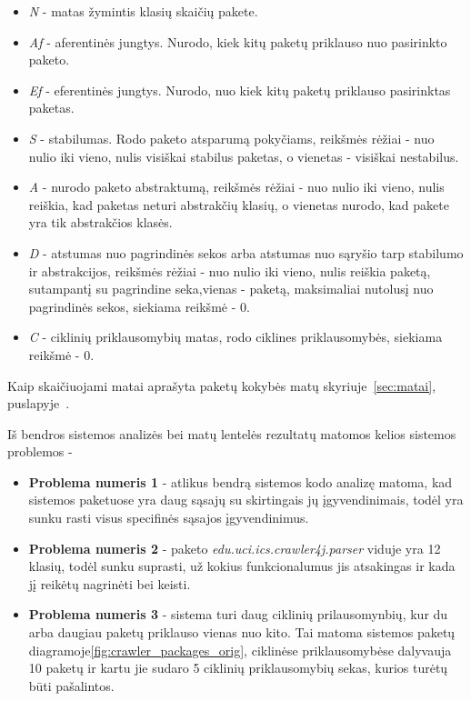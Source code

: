 \begin{itemize}
    \item \textit{N} - matas žymintis klasių skaičių pakete.
    \item \textit{Af} - aferentinės jungtys. Nurodo, kiek kitų paketų priklauso nuo pasirinkto paketo.
    \item \textit{Ef} - eferentinės jungtys. Nurodo, nuo kiek kitų paketų priklauso pasirinktas paketas.
    \item \textit{S} - stabilumas. Rodo paketo atsparumą pokyčiams, reikšmės rėžiai - nuo nulio iki vieno, nulis visiškai stabilus paketas, o vienetas - visiškai nestabilus.
    \item \textit{A} - nurodo paketo abstraktumą, reikšmės rėžiai - nuo nulio iki vieno, nulis reiškia, kad paketas neturi abstrakčių klasių, o vienetas nurodo, kad pakete yra tik abstrakčios klasės.
    \item \textit{D} - atstumas nuo pagrindinės sekos arba atstumas nuo sąryšio tarp stabilumo ir abstrakcijos, reikšmės rėžiai - nuo nulio iki vieno, nulis reiškia paketą, sutampantį su pagrindine seka,vienas - paketą, maksimaliai nutolusį nuo pagrindinės sekos, siekiama reikšmė - 0.
    \item \textit{C} - ciklinių priklausomybių matas, rodo ciklines priklausomybės, siekiama reikšmė - 0.
\end{itemize}
Kaip skaičiuojami matai aprašyta paketų kokybės matų skyriuje~\ref{sec:matai}, puslapyje~\pageref{sec:matai}.

Iš bendros sistemos analizės bei matų lentelės rezultatų matomos kelios sistemos problemos -
\begin{itemize}
    \item \textbf{Problema numeris 1} - atlikus bendrą sistemos kodo analizę matoma,
    kad sistemos paketuose yra daug sąsajų su skirtingais jų įgyvendinimais, todėl yra sunku
    rasti visus specifinės sąsajos įgyvendinimus.
    \item \textbf{Problema numeris 2} - paketo \textit{edu.uci.ics.crawler4j.parser} viduje yra 12 klasių, todėl sunku suprasti, už kokius funkcionalumus jis atsakingas
    ir kada jį reikėtų nagrinėti bei keisti.
    \item \textbf{Problema numeris 3} - sistema turi daug ciklinių prilausomynbių, kur du arba daugiau paketų priklauso vienas nuo kito.
    Tai matoma sistemos paketų diagramoje\ref{fig:crawler_packages_orig}, ciklinėse priklausomybėse dalyvauja 10 paketų ir kartu jie sudaro 5 ciklinių priklausomybių sekas,
    kurios turėtų būti pašalintos.
\end{itemize}

